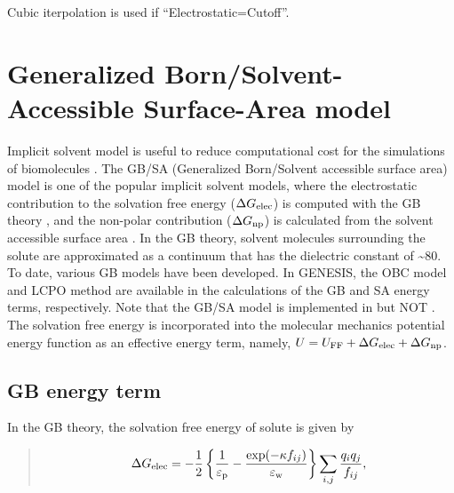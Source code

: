 \documentclass[a4paper,11pt,oneside,english]{sphinxmanual}
\begin{document}
Cubic iterpolation is used if “Electrostatic=Cutoff”.


\section{Generalized Born/Solvent-Accessible Surface-Area model}
\label{\detokenize{05_Energy:generalized-born-solvent-accessible-surface-area-model}}
Implicit solvent model is useful to reduce computational cost
for the simulations of biomolecules . The GB/SA (Generalized
Born/Solvent accessible surface area) model is one of the popular
implicit solvent models, where the electrostatic contribution
to the solvation free energy (\(\Delta {G_{{\rm{elec}}}}\))
is computed with the GB theory , and the non-polar contribution (\(\Delta {G_{{\rm{np}}}}\))
is calculated from the solvent accessible surface area .
In the GB theory, solvent molecules
surrounding the solute are approximated as a continuum that has
the dielectric constant of \textasciitilde{}80. To date, various GB models have
been developed. In GENESIS, the OBC model  and LCPO method  are
available in the calculations of the GB and SA energy terms, respectively.
Note that the GB/SA model is implemented in  but NOT .
The solvation free energy is incorporated into the molecular
mechanics potential energy function as an effective energy term,
namely, \(U = U_{{\rm{FF}}} + \Delta {G_{{\rm{elec}}}} + \Delta {G_{{\rm{np}}}}\).


\subsection{GB energy term}
\label{\detokenize{05_Energy:gb-energy-term}}
In the GB theory, the solvation free energy of solute is given by
\begin{quote}

\vspace{-5mm}
\begin{equation*}
\begin{split}\Delta {G_{{\rm{elec}}}} =  - \frac{1}{2}\left\{ {\frac{1}{{{\varepsilon _{\rm{p}}}}} - \frac{{\exp ( - \kappa {f_{ij}})}}{{{\varepsilon _{\rm{w}}}}}} \right\}\sum\limits_{i,j} {\frac{{{q_i}{q_j}}}{{{f_{ij}}}}},\end{split}
\end{equation*}
\vspace{-3mm}
\end{quote}
\end{document}
